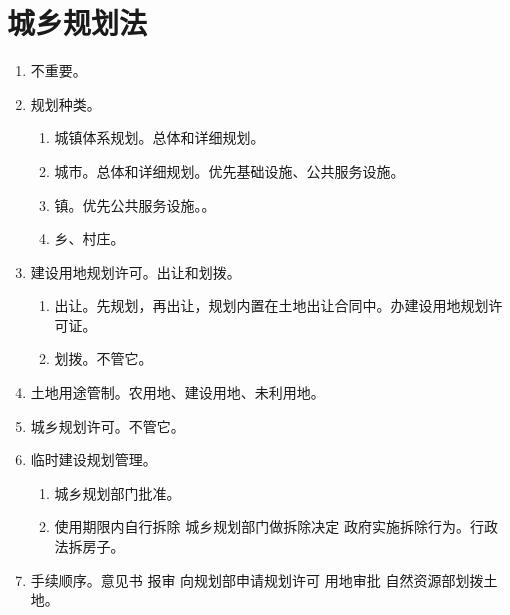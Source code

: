 \section{城乡规划法}
\begin{enumerate}
  \item 不重要。
  \item 规划种类。
        \begin{enumerate}
          \item 城镇体系规划。总体和详细规划。
          \item 城市。总体和详细规划。优先基础设施、公共服务设施。
          \item 镇。优先公共服务设施。。
          \item 乡、村庄。
        \end{enumerate}
  \item 建设用地规划许可。出让和划拨。
        \begin{enumerate}
          \item 出让。先规划，再出让，规划内置在土地出让合同中。办建设用地规划许可证。
          \item 划拨。不管它。
        \end{enumerate}
  \item 土地用途管制。农用地、建设用地、未利用地。
  \item 城乡规划许可。不管它。
  \item 临时建设规划管理。
        \begin{enumerate}
          \item 城乡规划部门批准。
          \item 使用期限内自行拆除 \yjt 城乡规划部门做拆除决定 \yjt 政府实施拆除行为。行政法拆房子。
        \end{enumerate}
  \item 手续顺序。意见书 \yjt 报审 \yjt 向规划部申请规划许可 \yjt 用地审批 \yjt 自然资源部划拨土地。
\end{enumerate}

